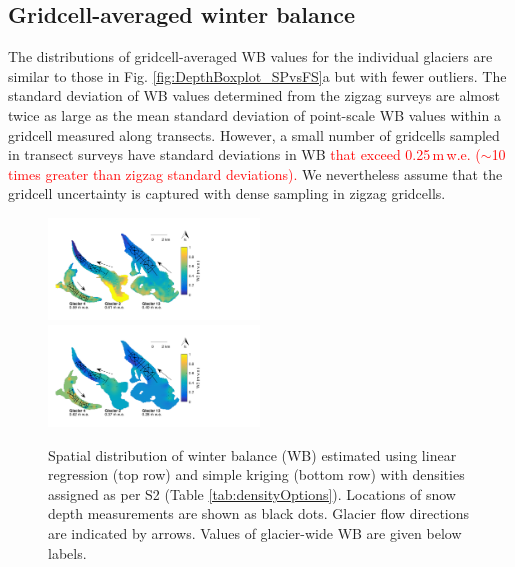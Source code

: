 \documentclass[review,oneside, letterpaper]{igs}
\begin{document}
\subsection{Gridcell-averaged winter balance}

The distributions of gridcell-averaged WB values for the individual glaciers are similar to those in Fig. \ref{fig:DepthBoxplot_SPvsFS}a but with fewer outliers. The standard deviation of WB values determined from the zigzag surveys are almost twice as large as the mean standard deviation of point-scale WB values within a gridcell measured along transects. However, a small number of gridcells sampled in transect surveys have standard deviations in WB \textcolor{red}{that exceed 0.25\,m\,w.e. ($\sim$10 times greater than zigzag standard deviations).} We nevertheless assume that the gridcell uncertainty is captured with dense sampling in zigzag gridcells. 

\begin{figure}
	\centering
	\includegraphics[width =0.5\textwidth]{LR_map.pdf}\\
    \includegraphics[width =0.5\textwidth]{SK_map.pdf}\\
	\caption{Spatial distribution of winter balance (WB) estimated using linear regression (top row) and simple kriging (bottom row) with densities assigned as per S2 (Table \ref{tab:densityOptions}). Locations of snow depth measurements are shown as black dots. Glacier flow directions are indicated by arrows. Values of glacier-wide WB are given below labels.}
	\label{fig:LR_SK_map}
\end{figure}
\end{document}
